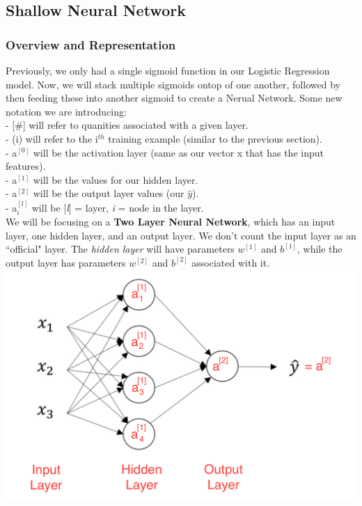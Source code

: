 \documentclass[11pt, a4paper]{article}
\begin{document}
\begin{spacing}{1.1}
	\subsection{Shallow Neural Network}
	\subsubsection{Overview and Representation}
	Previously, we only had a single sigmoid function in our Logistic Regression model. Now, we will stack multiple sigmoids ontop of one another, followed by then feeding these into another sigmoid to create a Nerual Network. Some new notation we are introducing: \vspace*{1mm} \\
	\hspace*{3mm} - [\#] will refer to quanities associated with a given layer. \\
	\hspace*{3mm} - (i) will refer to the i$^{th}$ training example (similar to the previous section). \\
	\hspace*{3mm} - a$^{[0]}$ will be the activation layer (same as our vector x that has the input features). \\
	\hspace*{3mm} - a$^{[1]}$ will be the values for our hidden layer. \\
	\hspace*{3mm} - a$^{[2]}$ will be the output layer values (our $\hat{y}$). \\
	\hspace*{3mm} - a$^{[l]}_i$ will be [\textit{l}] = layer, \textit{i} = node in the layer. \vspace*{1mm} \\
	We will be focusing on a \textbf{Two Layer Neural Network}, which has an input layer, one hidden layer, and an output layer. We don't count the input layer as an ``official" layer. The \textit{hidden layer} will have parameters $w^{[1]}$ and $b^{[1]}$, while the output layer has parameters $w^{[2]}$ and $b^{[2]}$ associated with it. 
	\hspace*{16mm} \includegraphics[scale=.5]{NN_rep} 

\end{spacing}
\end{document}
